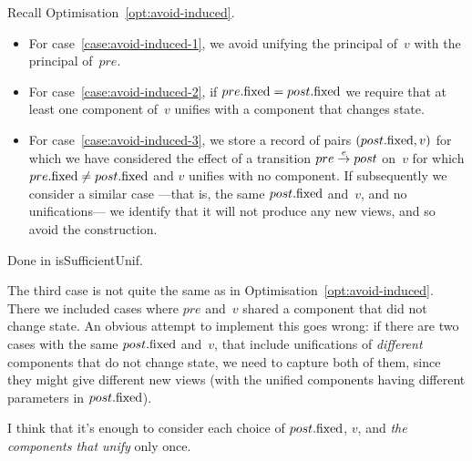 \begin{opt}
Recall Optimisation~\ref{opt:avoid-induced}.  
\begin{itemize}
\item For case~\ref{case:avoid-induced-1}, we avoid unifying the principal
  of~$v$ with the principal of~$pre$.

\item For case~\ref{case:avoid-induced-2}, if $pre.\mathrm{fixed} = post.\mathrm{fixed}$ we
  require that at least one component of~$v$ unifies with a component that
  changes state.

\item For case~\ref{case:avoid-induced-3}, we store a record of pairs
  $(post.\mathrm{fixed}, v)$ for which we have considered the effect of a transition
  $pre \stackrel{e}\rightarrow post$ on~$v$ for which $pre.\mathrm{fixed} \ne post.\mathrm{fixed}$ and $v$
  unifies with no component.
%
  If subsequently we consider a similar case ---that is, the same
  $post.\mathrm{fixed}$ and~$v$, and no unifications--- we identify that it will not
  produce any new views, and so avoid the construction.
\end{itemize}
\end{opt}


\begin{impNote}
Done in isSufficientUnif. 
\end{impNote}

\begin{improve}
The third case is not quite the same as in
Optimisation~\ref{opt:avoid-induced}.  There we included cases where $pre$
and~$v$ shared a component that did not change state.  An obvious attempt to
implement this goes wrong: if there are two cases with the same $post.\mathrm{fixed}$
and~$v$, that include unifications of \emph{different} components that do not
change state, we need to capture both of them, since they might give different
new views (with the unified components having different parameters in
$post.\mathrm{fixed}$).

I think that it's enough to consider each choice of $post.\mathrm{fixed}$, $v$, and
\emph{the components that unify} only once.
\end{improve}

 
